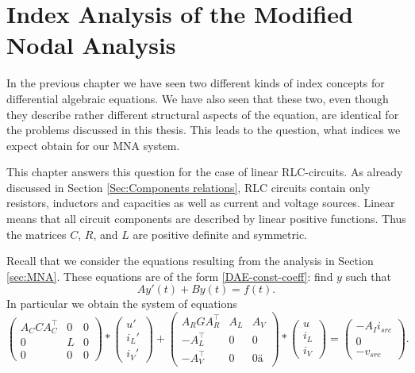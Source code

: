 \chapter{Index Analysis of the Modified Nodal Analysis}
\label{sec:index analysis of the modified nodal analysis}

\cite{ModellingAndDiscretizationOfCircuitProblems}

In the previous chapter we have seen two different kinds of index concepts for differential algebraic equations. We have also seen that these two, even though they describe rather different structural aspects of the equation, are identical for the problems discussed in this thesis. %
 This leads to the question, what indices we expect obtain for our MNA system.

This chapter answers this question for the case of linear RLC-circuits. As already discussed in Section \ref{Sec:Components relations}, RLC circuits contain only resistors, inductors and capacities as well as current and voltage sources. Linear means that all circuit components are described by linear positive functions. Thus the matrices $C$, $R$, and $L$ are positive definite and symmetric.

Recall that we consider the equations resulting from the analysis in Section \ref{sec:MNA}. These equations are of the form \eqref{DAE-const-coeff}: find $y$ such that
\begin{displaymath}
	A y'(t) + B y(t) = f(t).
\end{displaymath}
In particular we obtain the system of equations
\begin{displaymath}
	\begin{pmatrix}
		A_C C A_C^\top & 0 & 0 \\
		0 & L & 0 \\
		0 & 0 & 0
	\end{pmatrix}
	*
	\begin{pmatrix}
		u' \\
		i_L' \\
		i_V'
	\end{pmatrix}
	+
	\begin{pmatrix}
		A_R G A_R^\top & A_L & A_V \\
		-A_L^\top & 0 & 0 \\
		-A_V^\top & 0 & 0 ä
	\end{pmatrix}
	*
	\begin{pmatrix}
		u \\
		i_L \\
		i_V
	\end{pmatrix}
	=
	\begin{pmatrix}
		-A_I i_{src} \\
		0 \\
		-v_{src}
	\end{pmatrix}.
\end{displaymath}

